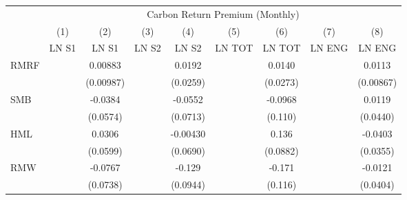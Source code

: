 {
\def\sym#1{\ifmmode^{#1}\else\(^{#1}\)\fi}
\begin{tabular}{l*{8}{c}}
\hline\hline
                    &\multicolumn{8}{c}{Carbon Return Premium (Monthly)}                                                                                                                            \\\cmidrule(lr){2-9}
                    &\multicolumn{1}{c}{(1)}&\multicolumn{1}{c}{(2)}&\multicolumn{1}{c}{(3)}&\multicolumn{1}{c}{(4)}&\multicolumn{1}{c}{(5)}&\multicolumn{1}{c}{(6)}&\multicolumn{1}{c}{(7)}&\multicolumn{1}{c}{(8)}\\
                    &\multicolumn{1}{c}{LN S1}&\multicolumn{1}{c}{LN S1}&\multicolumn{1}{c}{LN S2}&\multicolumn{1}{c}{LN S2}&\multicolumn{1}{c}{LN TOT}&\multicolumn{1}{c}{LN TOT}&\multicolumn{1}{c}{LN ENG}&\multicolumn{1}{c}{LN ENG}\\
\hline
RMRF                &                     &     0.00883         &                     &      0.0192         &                     &      0.0140         &                     &      0.0113         \\
                    &                     &   (0.00987)         &                     &    (0.0259)         &                     &    (0.0273)         &                     &   (0.00867)         \\
SMB                 &                     &     -0.0384         &                     &     -0.0552         &                     &     -0.0968         &                     &      0.0119         \\
                    &                     &    (0.0574)         &                     &    (0.0713)         &                     &     (0.110)         &                     &    (0.0440)         \\
HML                 &                     &      0.0306         &                     &    -0.00430         &                     &       0.136         &                     &     -0.0403         \\
                    &                     &    (0.0599)         &                     &    (0.0690)         &                     &    (0.0882)         &                     &    (0.0355)         \\
RMW                 &                     &     -0.0767         &                     &      -0.129         &                     &      -0.171         &                     &     -0.0121         \\
                    &                     &    (0.0738)         &                     &    (0.0944)         &                     &     (0.116)         &                     &    (0.0404)         \\

\end{tabular}}
